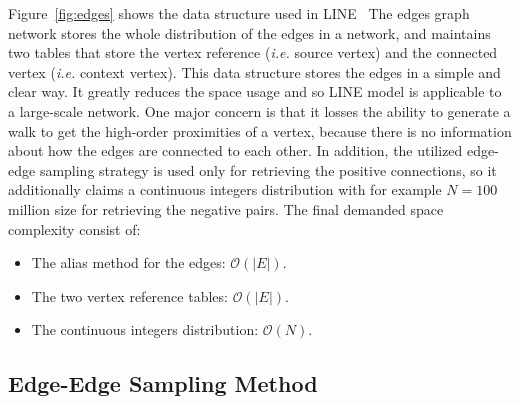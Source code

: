 Figure~\ref{fig:edges} shows the data structure used in LINE~\cite{line} The edges graph network stores the whole distribution of the edges in a network, and maintains two tables that store the vertex reference (\textit{i.e.} source vertex) and the connected vertex (\textit{i.e.} context vertex). This data structure stores the edges in a simple and clear way. It greatly reduces the space usage and so LINE model is applicable to a large-scale network. One major concern is that it losses the ability to generate a walk to get the high-order proximities of a vertex, because there is no information about how the edges are connected to each other. In addition, the utilized edge-edge sampling strategy is used only for retrieving the positive connections, so it additionally claims a continuous integers distribution with for example $N=100$ million size for retrieving the negative pairs. The final demanded space complexity consist of:
\begin{itemize}
  \item The alias method for the edges: $\mathcal{O}(|E|)$.
  \item The two vertex reference tables: $\mathcal{O}(|E|)$.
  \item The continuous integers distribution: $\mathcal{O}(N)$.
\end{itemize}


\subsection{Edge-Edge Sampling Method}\label{sec:ee}

